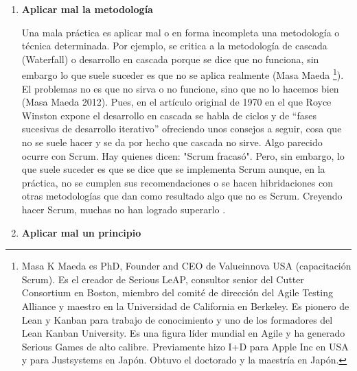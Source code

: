 \begin{enumerate}

\item \textbf{Aplicar mal la metodología}

Una mala práctica es aplicar mal o en forma incompleta una metodología o técnica determinada. Por ejemplo, se critica a la metodología de cascada (Waterfall) o desarrollo en cascada porque se dice que no funciona, sin embargo lo que suele suceder es que no se aplica realmente (Masa Maeda \footnote{Masa K Maeda es PhD, Founder and CEO de Valueinnova USA (capacitación Scrum). Es el creador de Serious LeAP, consultor senior del Cutter Consortium en Boston, miembro del comité de dirección del Agile Testing Alliance y maestro en la Universidad de California en Berkeley. Es pionero de Lean y Kanban para trabajo de conocimiento y uno de los formadores del Lean Kanban University. Es una figura líder mundial en Agile y ha generado Serious Games de alto calibre. Previamente hizo I+D para Apple Inc en USA y para Justsystems en Japón. Obtuvo el doctorado y la maestría en Japón.}). El problemas no es que no sirva o no funcione, sino que no lo hacemos bien (Masa Maeda  2012). Pues, en el artículo original de 1970 en el que Royce Winston expone el desarrollo en cascada se habla de ciclos y de “fases sucesivas de desarrollo iterativo” \cite{Winston-Royce-1970} ofreciendo unos consejos a seguir, cosa que no se suele hacer y se da por hecho que cascada no sirve. Algo parecido ocurre con Scrum. Hay quienes dicen:  "Scrum fracasó". Pero, sin embargo, lo que suele suceder es que se dice que se implementa Scrum aunque, en la práctica, no se cumplen sus recomendaciones o se hacen hibridaciones con otras metodologías que dan como resultado algo que no es Scrum. Creyendo hacer Scrum, muchas no han logrado superarlo \cite{Gantthead-James-2010}. 

\item \textbf{Aplicar mal un principio}


\end{enumerate}
